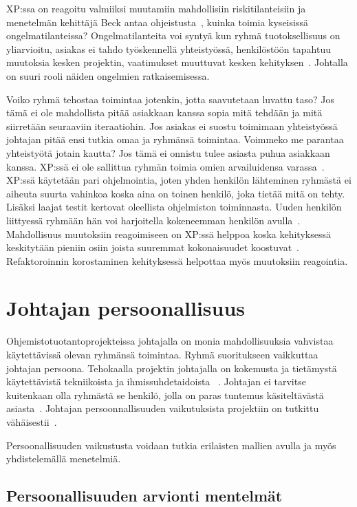 \documentclass[finnish]{tktltiki2}
\theoremstyle{definition}
\theoremstyle{remark}
\begin{document}
XP:ssa on reagoitu valmiiksi muutamiin mahdollisiin riskitilanteisiin ja menetelmän kehittäjä Beck antaa ohjeistusta~\cite{796139}, kuinka toimia kyseisissä ongelmatilanteissa? Ongelmatilanteita voi syntyä kun ryhmä tuotoksellisuus on yliarvioitu, asiakas ei tahdo työskennellä yhteistyössä, henkilöstöön tapahtuu muutoksia kesken projektin, vaatimukset muuttuvat kesken kehityksen~\cite{796139}. Johtalla on suuri rooli näiden ongelmien ratkaisemisessa.

Voiko ryhmä tehostaa toimintaa jotenkin, jotta saavutetaan luvattu taso? Jos tämä ei ole mahdollista pitää asiakkaan kanssa sopia mitä tehdään ja mitä siirretään seuraaviin iteraatiohin. Jos asiakas ei suostu toimimaan yhteistyössä johtajan pitää ensi tutkia omaa ja ryhmänsä toimintaa. Voimmeko me parantaa yhteistyötä jotain kautta? Jos tämä ei onnistu tulee asiasta puhua asiakkaan kanssa. XP:ssä ei ole sallittua ryhmän toimia omien arvailuidensa varassa~\cite{796139}. XP:ssä käytetään pari ohjelmointia, joten yhden henkilön lähteminen ryhmästä ei aiheuta suurta vahinkoa koska aina on toinen henkilö, joka tietää mitä on tehty. Lisäksi laajat testit kertovat oleellista ohjelmiston toiminnasta. Uuden henkilön liittyessä ryhmään hän voi harjoitella kokeneemman henkilön avulla~\cite{796139}. Mahdollisuus muutoksiin reagoimiseen on XP:ssä helppoa koska kehityksessä keskitytään pieniin osiin joista suuremmat kokonaisuudet koostuvat~\cite{796139}. Refaktoroinnin korostaminen kehityksessä helpottaa myös muutoksiin reagointia.   
 

\section{Johtajan persoonallisuus}

Ohjemistotuotantoprojekteissa johtajalla on monia mahdollisuuksia vahvistaa käytettävissä olevan ryhmänsä toimintaa. Ryhmä suoritukseen vaikkuttaa johtajan persoona. Tehokaalla projektin johtajalla on kokemusta ja tietämystä käytettävistä tekniikoista ja ihmissuhdetaidoista ~\cite{McLeod:2011:FAS:1978802.1978803}. Johtajan ei tarvitse kuitenkaan olla ryhmästä se henkilö, jolla on paras tuntemus käsiteltävästä asiasta~\cite{4017705}. Johtajan persoonnallisuuden vaikutuksista projektiin on tutkittu vähäisestii~\cite{Wang:2009:PMP:1639950.1640049}. 

Persoonallisuuden vaikustusta voidaan tutkia erilaisten mallien avulla ja myös yhdistelemällä menetelmiä. 


\subsection{Persoonallisuuden arvionti mentelmät}
\end{document}
